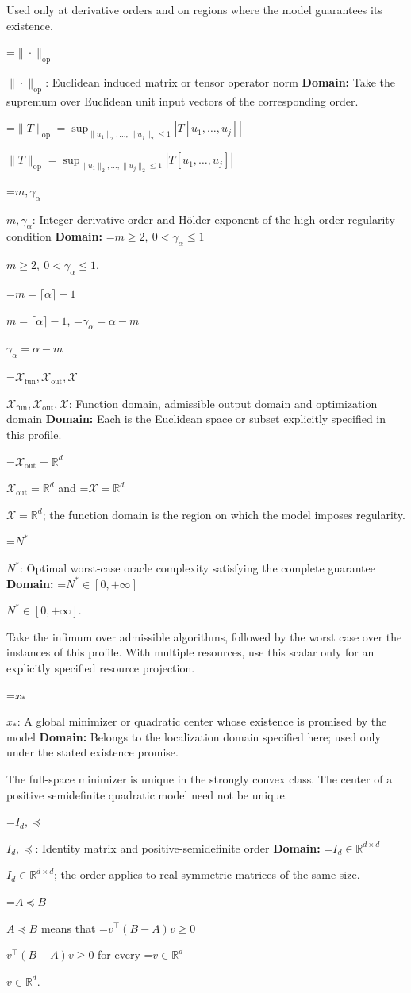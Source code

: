 \documentclass[10pt,a4paper]{article}
\newcommand{\AtlasMath}[1]{\par\begingroup\centering\setbox0=\hbox{$\displaystyle #1$}\ifdim\wd0>1.4\linewidth\typeout{ATLAS WIDE FORMULA: \the\wd0}\fi\ifdim\wd0>\linewidth\resizebox{\linewidth}{!}{\box0}\else\box0\fi\par\endgroup}
\newcommand{\AtlasInlineMath}[1]{\begingroup\setbox0=\hbox{$#1$}\ifdim\wd0>.4\linewidth\endgroup\AtlasMath{#1}\else\endgroup$#1$\fi}
\begin{document}
Used only at derivative orders and on regions where the model guarantees its existence.

\AtlasInlineMath{\|\cdot\|_{\mathrm{op}}}: Euclidean induced matrix or tensor operator norm \textbf{Domain:} Take the supremum over Euclidean unit input vectors of the corresponding order.

\AtlasInlineMath{\|T\|_{\mathrm{op}}=\sup_{\|u_1\|_2,\ldots,\|u_j\|_2\le1}|T[u_1,\ldots,u_j]|}

\AtlasInlineMath{m,\gamma_\alpha}: Integer derivative order and Hölder exponent of the high-order regularity condition \textbf{Domain:} \AtlasInlineMath{m\ge2,\ 0<\gamma_\alpha\le1}.

\AtlasInlineMath{m=\lceil\alpha\rceil-1}, \AtlasInlineMath{\gamma_\alpha=\alpha-m}

\AtlasInlineMath{\mathcal{X}_{\mathrm{fun}},\mathcal{X}_{\mathrm{out}},\mathcal{X}}: Function domain, admissible output domain and optimization domain \textbf{Domain:} Each is the Euclidean space or subset explicitly specified in this profile.

\AtlasInlineMath{\mathcal{X}_{\mathrm{out}}=\mathbb{R}^d} and \AtlasInlineMath{\mathcal{X}=\mathbb{R}^d}; the function domain is the region on which the model imposes regularity.

\AtlasInlineMath{N^*}: Optimal worst-case oracle complexity satisfying the complete guarantee \textbf{Domain:} \AtlasInlineMath{N^*\in[0,+\infty]}.

Take the infimum over admissible algorithms, followed by the worst case over the instances of this profile. With multiple resources, use this scalar only for an explicitly specified resource projection.

\AtlasInlineMath{x_*}: A global minimizer or quadratic center whose existence is promised by the model \textbf{Domain:} Belongs to the localization domain specified here; used only under the stated existence promise.

The full-space minimizer is unique in the strongly convex class. The center of a positive semidefinite quadratic model need not be unique.

\AtlasInlineMath{I_d,\preceq}: Identity matrix and positive-semidefinite order \textbf{Domain:} \AtlasInlineMath{I_d\in\mathbb{R}^{d\times d}}; the order applies to real symmetric matrices of the same size.

\AtlasInlineMath{A\preceq B} means that \AtlasInlineMath{v^\top(B-A)v\ge0} for every \AtlasInlineMath{v\in\mathbb{R}^d}.
\end{document}
